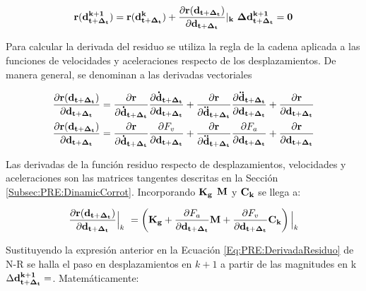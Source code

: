 \begin{equation}\label{Eq:MET:Residuo}
	\bf{r}(\bf{d}^{k+1}_{t+\Delta_t})=\bf{r}(\bf{d}^k_{t+\Delta_t}) +
	\frac{\partial  \bf{r}(\bf{d}_{t+\Delta_t})}{\partial
		\bf{d}_{t+\Delta_t}}|_k~\Delta \bf{d}^{k+1}_{t+\Delta_t}=0
\end{equation}

Para calcular la derivada del residuo se utiliza la regla de la cadena aplicada a las funciones de velocidades y aceleraciones respecto de los desplazamientos. De manera general, se denominan a las derivadas vectoriales 

\begin{equation}\label{Eq:MET:DerivadaResiduo}
	\begin{split}
	\frac{\partial  \bf{r}(\bf{d}_{t+\Delta_t})}{\partial
	\bf{d}_{t+\Delta_t}}&=\frac{\partial  \bf{r}}{\partial
	\bf{\dot{d}}_{t+\Delta_t}}\frac{\partial 
	\bf{\bf{\dot{d}}_{t+\Delta_t}}}{\partial \bf{{d}}_{t+\Delta_t}}+ \frac{\partial 
	\bf{r}}{\partial \bf{\ddot{d}}_{t+\Delta_t}}\frac{\partial 
	\bf{\bf{\ddot{d}}_{t+\Delta_t}}}{\partial \bf{{d}}_{t+\Delta_t}}+\frac{\partial 
	\bf{r}}{\partial \bf{{d}}_{t+\Delta_t}}\\
	\frac{\partial  \bf{r}(\bf{d}_{t+\Delta_t})}{\partial \bf{d}_{t+\Delta_t}}&= \frac{\partial  \bf{r}}{\partial\bf{\dot{d}}_{t+\Delta_t}}\frac{\partial F_v}{\partial \bf{{d}}_{t+\Delta_t}}+\frac{\partial  \bf{r}}{\partial\bf{\ddot{d}}_{t+\Delta_t}}\frac{\partial F_a}{\partial \bf{{d}}_{t+\Delta_t}}+\frac{\partial 
		\bf{r}}{\partial \bf{{d}}_{t+\Delta_t}}
	\end{split}
\end{equation}

Las derivadas de la función residuo respecto de desplazamientos, velocidades y aceleraciones son las matrices tangentes descritas en la Sección \ref{Subsec:PRE:DinamicCorrot}. Incorporando $\bf{K_g}$ $\bf{M}$ y $\bf{C_k}$ se llega a:

\begin{equation}\label{Eq:PRE:DerivadaResiduo}
	\frac{\partial  \bf{r}(\bf{d}_{t+\Delta_t})}{\partial \bf{d}_{t+\Delta_t}}\Big|_k~
	= \left (\bf{K}_g+\frac{\partial\text{$ F_a$}}{\partial \bf{{d}}_{t+\Delta_t}}\bf{M} + \frac{\partial\text{$ F_v$}}{\partial \bf{{d}}_{t+\Delta_t}}\bf{C}_k \right)\Big|_k
\end{equation}

Sustituyendo la expresión anterior en la Ecuación \eqref{Eq:PRE:DerivadaResiduo} de N-R se halla el paso en desplazamientos en $k+1$ a partir de las magnitudes en k $\Delta \bf{d}^{k+1}_{t+\Delta_t}=$. Matemáticamente:



